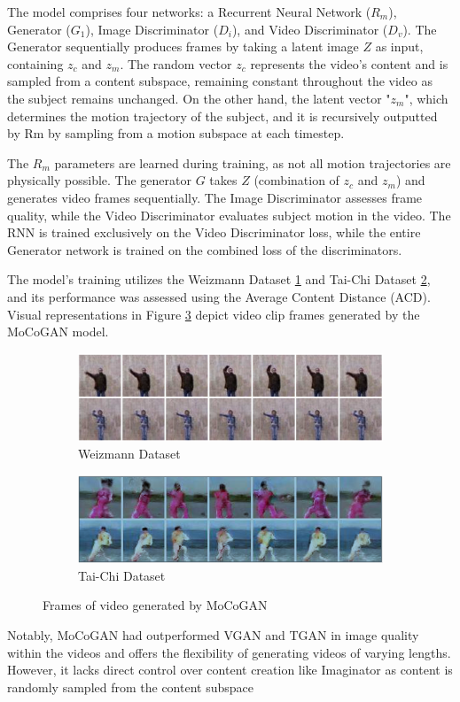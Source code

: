 \documentclass[12pt,twoside,a4paper,parskip]{scrbook} %
\begin{document}
The model comprises four networks: a Recurrent Neural Network ($R_m$), Generator ($G_1$), Image Discriminator ($D_i$), and Video Discriminator ($D_v$). The Generator sequentially produces frames by taking a latent image $Z$ as input, containing $z_c$ and $z_m$. The random vector $z_c$ represents the video's content and is sampled from a content subspace, remaining constant throughout the video as the subject remains unchanged. On the other hand, the latent vector "$z_m$", which determines the motion trajectory of the subject, and it is recursively outputted by Rm by sampling from a motion subspace at each timestep.

The $R_m$ parameters are learned during training, as not all motion trajectories are physically possible. The generator $G$ takes $Z$ (combination of $z_c$ and $z_m$) and generates video frames sequentially. The Image Discriminator assesses frame quality, while the Video Discriminator evaluates subject motion in the video. The RNN is trained exclusively on the Video Discriminator loss, while the entire Generator network is trained on the combined loss of the discriminators.

The model's training utilizes the Weizmann Dataset \cite{15_act_rec} \ref{fig:moco1} and Tai-Chi Dataset \cite{17_taichi} \ref{fig:Moco2}, and its performance was assessed using the Average Content Distance (ACD). Visual representations in Figure \ref{fig:moco} depict video clip frames generated by the MoCoGAN model.
\begin{figure}[htb]
    \centering
    \begin{subfigure}{0.6\textwidth}
        \centering
        \includegraphics[width=\linewidth]{Images/Moco1.png}
        \caption{Weizmann Dataset}
        \label{fig:moco1}
    \end{subfigure}
    \hfill
    \begin{subfigure}{0.6\textwidth}
        \centering
        \includegraphics[width=\linewidth]{Images/Moco2.png}
        \caption{Tai-Chi Dataset}
        \label{fig:Moco2}
    \end{subfigure}
    \caption{Frames of video generated by MoCoGAN}
    \label{fig:moco}
\end{figure}
Notably, MoCoGAN had outperformed VGAN \cite{8_Vgan}and TGAN \cite{tgan} in image quality within the videos and offers the flexibility of generating videos of varying lengths. However, it lacks direct control over content creation like Imaginator as content is randomly sampled from the content subspace
\end{document}
